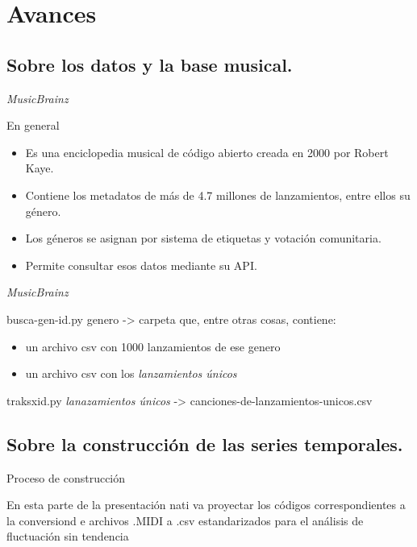 \documentclass[11pt]{beamer}
\begin{document}
\section{Avances}
\subsection{Sobre los datos y la base musical.}
\begin{frame}{\textit{MusicBrainz}}
	\begin{block}{En general}
		\begin{itemize}
			\item Es una enciclopedia musical de código abierto creada en 2000 por Robert Kaye.
			\item Contiene los metadatos de más de 4.7 millones de lanzamientos, entre ellos su género.
			\item Los géneros se asignan por sistema de etiquetas y votación comunitaria.
			\item Permite consultar esos datos mediante su API.
		\end{itemize}
	\end{block}
\end{frame} 

\begin{frame}{\textit{MusicBrainz}}
	\begin{block}{busca-gen-id.py}
		genero -> carpeta que, entre otras cosas, contiene:
		\begin{itemize}
			\item un archivo csv con 1000 lanzamientos de ese genero
			\item un archivo csv con los \textit{lanzamientos únicos}
		\end{itemize}
	\end{block}
	\begin{block}{traksxid.py}
		\textit{lanazamientos únicos} -> canciones-de-lanzamientos-unicos.csv
	\end{block}
\end{frame}


\subsection{Sobre la construcción de las series temporales.}
\begin{frame}{Proceso de construcción}
	\begin{block}{}
		En esta parte de la presentación nati va proyectar los códigos correspondientes a la conversiond e archivos .MIDI a .csv estandarizados para el análisis de fluctuación sin tendencia
	\end{block}
\end{frame}
\end{document}
